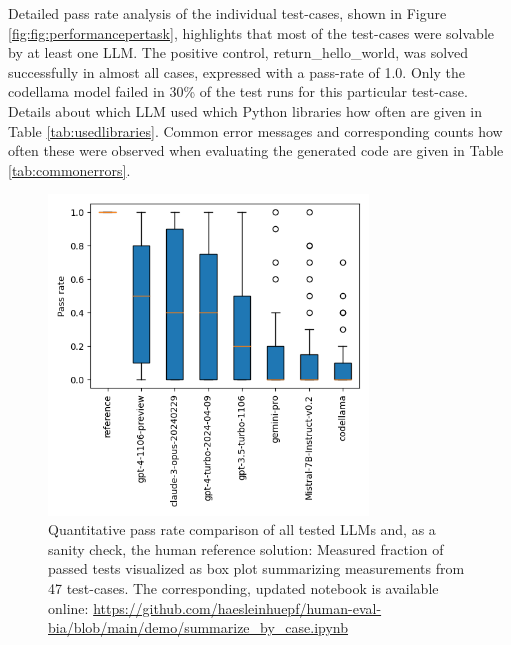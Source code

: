 \documentclass{ecai}
\begin{document}
Detailed pass rate analysis of the individual test-cases, shown in Figure \ref{fig:fig:performancepertask}, highlights that most of the test-cases were solvable by at least one LLM. The positive control, return\_hello\_world, was solved successfully in almost all cases, expressed with a pass-rate of 1.0. Only the codellama model failed in 30\% of the test runs for this particular test-case. Details about which LLM used which Python libraries how often are given in Table \ref{tab:usedlibraries}. Common error messages and corresponding counts how often these were observed when evaluating the generated code are given in Table \ref{tab:commonerrors}.


\begin{figure}[h]
\centering
\includegraphics[width=8.5cm]{pass_rate_llms.png}
\caption{Quantitative pass rate comparison of all tested LLMs and, as a sanity check, the human reference solution: Measured fraction of passed tests visualized as box plot summarizing measurements from 47 test-cases. The corresponding, updated notebook is available online: 
\url{https://github.com/haesleinhuepf/human-eval-bia/blob/main/demo/summarize_by_case.ipynb}
\newline
\newline
}
\label{fig:passratellms}
\end{figure}
\end{document}
